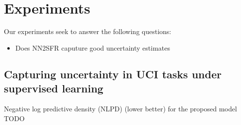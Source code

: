 \documentclass{article}
\newlength{\tblw}
\newcommand{\state}{\ensuremath{\mathbf{s}}}
\newcommand{\action}{\ensuremath{\mathbf{a}}}
\newcommand{\inducingVariable}{\ensuremath{\mathbf{u}}}
\newcommand{\dualParam}[1]{\ensuremath{\bm{\lambda}_{#1}}}
\newcommand{\meanParam}[1]{\ensuremath{\bm{\mu}_{#1}}}
\newcommand{\horizon}{\ensuremath{h}}
\newcommand{\latentFn}{\ensuremath{f}}
\begin{document}
%
%
%



\section{Experiments}
\label{sec:experiments}


Our experiments seek to answer the following questions:
\begin{itemize}
  \item Does NN2SFR caputure good uncertainty estimates
\end{itemize}

\subsection{Capturing uncertainty in UCI tasks under supervised learning}
%


\begin{table}[t!] 
  \centering\scriptsize
  \caption{Negative log predictive density (NLPD) (lower better) for the proposed model TODO} 
	\label{tbl:uci}
	\renewcommand{\arraystretch}{1.}
	\setlength{\tabcolsep}{2pt}
	\setlength{\tblw}{0.14\textwidth}  
	
	\newcommand{\val}[2]{%
		$#1$\textcolor{gray}{\tiny ${\pm}#2$}
	} 

	
\end{table}
\end{document}
